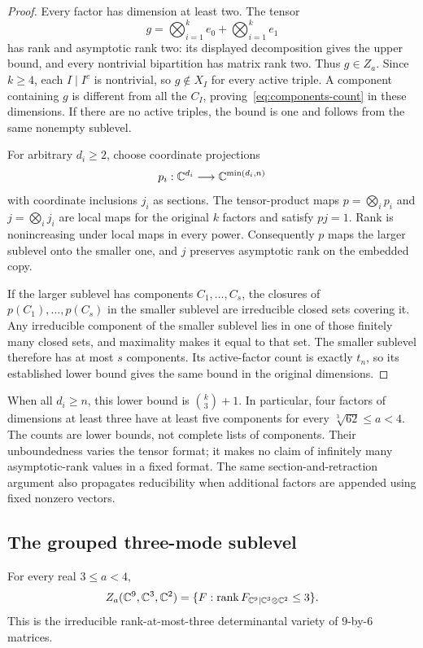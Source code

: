 \begin{proof}
Every factor has dimension at least two. The tensor
\[
 g=\bigotimes_{i=1}^k e_0+\bigotimes_{i=1}^k e_1
\]
has rank and asymptotic rank two: its displayed decomposition gives
the upper bound, and every nontrivial bipartition has matrix rank two.
Thus $g\in Z_a$. Since $k\geq4$, each $I\mid I^c$ is nontrivial,
so $g\notin X_I$ for every active triple. A component containing $g$
is different from all the $C_I$, proving~\eqref{eq:components-count}
in these dimensions. If there are no active triples, the bound is
one and follows from the same nonempty sublevel.

For arbitrary $d_i\geq2$, choose coordinate projections
\[
 p_i:\mathbb C^{d_i}\longrightarrow\mathbb C^{\min(d_i,n)}
\]
with coordinate inclusions $j_i$ as sections. The tensor-product maps
$p=\bigotimes_i p_i$ and $j=\bigotimes_i j_i$ are local maps for the
original $k$ factors and satisfy $pj=1$. Rank is nonincreasing under
local maps in every power. Consequently $p$ maps the larger sublevel
onto the smaller one, and $j$ preserves asymptotic rank on the embedded
copy.

If the larger sublevel has components $C_1,\ldots,C_s$, the closures
of $p(C_1),\ldots,p(C_s)$ in the smaller sublevel are irreducible
closed sets covering it. Any irreducible component of the smaller
sublevel lies in one of those finitely many closed sets, and maximality
makes it equal to that set. The smaller sublevel therefore has at most
$s$ components. Its active-factor count is exactly $t_n$, so its
established lower bound gives the same bound in the original dimensions.
\end{proof}

When all $d_i\geq n$, this lower bound is $\binom{k}{3}+1$.
In particular, four factors of dimensions at least three have at least
five components for every $\sqrt[3]{62}\leq a<4$. The counts are lower
bounds, not complete lists of components. Their unboundedness varies
the tensor format; it makes no claim of infinitely many asymptotic-rank
values in a fixed format. The same section-and-retraction argument
also propagates reducibility when additional factors are appended
using fixed nonzero vectors.

\subsection{The grouped three-mode sublevel}
\label{sec:components-grouping}

\begin{proposition}\label{prop:components-grouping}
For every real $3\leq a<4$,
\begin{equation}\label{eq:components-grouped}
 Z_a(\mathbb C^9,\mathbb C^3,\mathbb C^2)
   =\{F:\operatorname{rank} F_{\mathbb C^9\mid\mathbb C^3\otimes\mathbb C^2}\leq3\}.
\end{equation}
This is the irreducible rank-at-most-three determinantal variety of
$9$-by-$6$ matrices.
\end{proposition}

